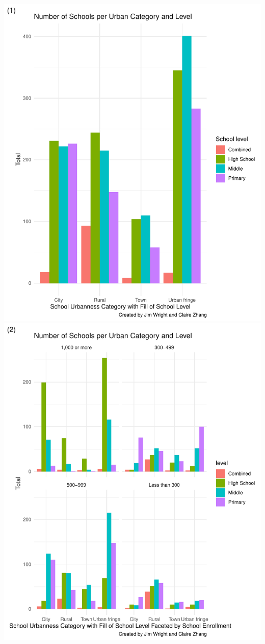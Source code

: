 \documentclass[man]{apa6}
\begin{document}
\includegraphics{Final-Project_Zhang_Wright_files/figure-latex/plots-1.pdf}
\includegraphics{Final-Project_Zhang_Wright_files/figure-latex/plots-2.pdf}
\end{document}
